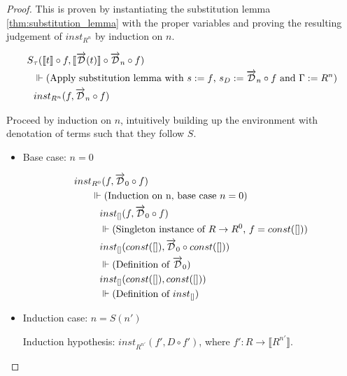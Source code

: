 \documentclass[11pt, final]{article}
\begin{document}
  \begin{proof}
    This is proven by instantiating the substitution lemma \ref{thm:substitution_lemma} with the proper variables and proving the resulting judgement of $inst_{R^n}$ by induction on $n$.

    \begin{align*}
      S&_{\tau}(\llbracket t \rrbracket \circ f, \llbracket \overrightarrow{\mathcal{D}}(t) \rrbracket \circ \overrightarrow{\mathcal{D}}_n \circ f) \\
      & \Vdash \text{(Apply substitution lemma with $s := f$, $s_D := \overrightarrow{\mathcal{D}}_n \circ f$ and $\Gamma := R^n$)} \\
      & inst_{R^n}(f, \overrightarrow{\mathcal{D}}_n \circ f) \\
    \end{align*}

    Proceed by induction on $n$, intuitively building up the environment with denotation of terms such that they follow $S$.

    \begin{itemize}
      \item Base case: $n = 0$

      \begin{align*}
        inst&_{R^0}(f, \overrightarrow{\mathcal{D}}_0 \circ f) \\
        & \Vdash \text{(Induction on n, base case $n = 0$)} \\
        & \;\;\; inst_{[]}(f, \overrightarrow{\mathcal{D}}_0 \circ f) \\
        & \;\;\; \Vdash \text{(Singleton instance of $R \rightarrow R^0$, $f = const([])$)} \\
        & \;\;\; inst_{[]}(const([]), \overrightarrow{\mathcal{D}}_0 \circ const([])) \\
        & \;\;\; \Vdash \text{(Definition of $\overrightarrow{\mathcal{D}}_0$)} \\
        & \;\;\; inst_{[]}(const([]), const([])) \\
        & \;\;\; \Vdash \text{(Definition of $inst_{[]}$)}
      \end{align*}

      \item Induction case: $n = S(n')$

      Induction hypothesis: $inst_{R^{n'}}(f', D \circ f')$, where
        $f' : R \rightarrow \llbracket R^{n'}\rrbracket$.


\end{itemize}
\end{proof}
\end{document}
